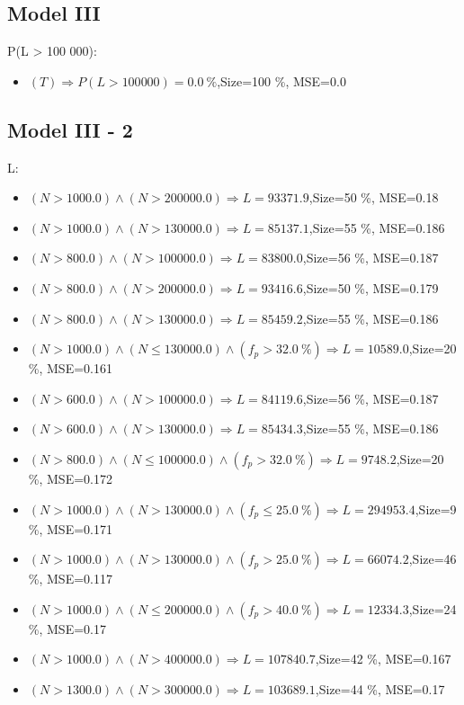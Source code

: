 \documentclass[numbered]{CSL}
\begin{document}
\subsection{Model III}
P(L > 100 000):
\begin{itemize}
\item $(T) \Rightarrow P(L > 100 000) = 0.0~\%$,\hfill Size=100 \%, MSE=0.0
\end{itemize}

\subsection{Model III - 2}
L:
\begin{itemize}
\item $(N > 1000.0) \land (N > 200000.0) \Rightarrow L = 93371.9$,\hfill Size=50 \%, MSE=0.18
\item $(N > 1000.0) \land (N > 130000.0) \Rightarrow L = 85137.1$,\hfill Size=55 \%, MSE=0.186
\item $(N > 800.0) \land (N > 100000.0) \Rightarrow L = 83800.0$,\hfill Size=56 \%, MSE=0.187
\item $(N > 800.0) \land (N > 200000.0) \Rightarrow L = 93416.6$,\hfill Size=50 \%, MSE=0.179
\item $(N > 800.0) \land (N > 130000.0) \Rightarrow L = 85459.2$,\hfill Size=55 \%, MSE=0.186
\item $(N > 1000.0) \land (N \leq 130000.0) \land (f_p > 32.0~\%) \Rightarrow L = 10589.0$,\hfill Size=20 \%, MSE=0.161
\item $(N > 600.0) \land (N > 100000.0) \Rightarrow L = 84119.6$,\hfill Size=56 \%, MSE=0.187
\item $(N > 600.0) \land (N > 130000.0) \Rightarrow L = 85434.3$,\hfill Size=55 \%, MSE=0.186
\item $(N > 800.0) \land (N \leq 100000.0) \land (f_p > 32.0~\%) \Rightarrow L = 9748.2$,\hfill Size=20 \%, MSE=0.172
\item $(N > 1000.0) \land (N > 130000.0) \land (f_p \leq 25.0~\%) \Rightarrow L = 294953.4$,\hfill Size=9 \%, MSE=0.171
\item $(N > 1000.0) \land (N > 130000.0) \land (f_p > 25.0~\%) \Rightarrow L = 66074.2$,\hfill Size=46 \%, MSE=0.117
\item $(N > 1000.0) \land (N \leq 200000.0) \land (f_p > 40.0~\%) \Rightarrow L = 12334.3$,\hfill Size=24 \%, MSE=0.17
\item $(N > 1000.0) \land (N > 400000.0) \Rightarrow L = 107840.7$,\hfill Size=42 \%, MSE=0.167
\item $(N > 1300.0) \land (N > 300000.0) \Rightarrow L = 103689.1$,\hfill Size=44 \%, MSE=0.17

\end{itemize}
\end{document}
